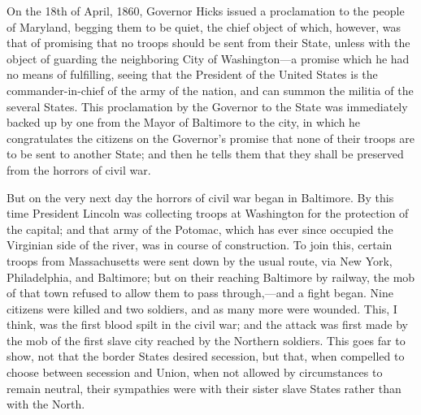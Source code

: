 On the 18th of April, 1860, Governor Hicks issued a proclamation to
the people of Maryland, begging them to be quiet, the chief object
of which, however, was that of promising that no troops should be
sent from their State, unless with the object of guarding the
neighboring City of Washington---a promise which he had no means of
fulfilling, seeing that the President of the United States is the
commander-in-chief of the army of the nation, and can summon the
militia of the several States.  This proclamation by the Governor
to the State was immediately backed up by one from the Mayor of
Baltimore to the city, in which he congratulates the citizens on
the Governor's promise that none of their troops are to be sent to
another State; and then he tells them that they shall be preserved
from the horrors of civil war.

But on the very next day the horrors of civil war began in
Baltimore.  By this time President Lincoln was collecting troops at
Washington for the protection of the capital; and that army of the
Potomac, which has ever since occupied the Virginian side of the
river, was in course of construction.  To join this, certain troops
from Massachusetts were sent down by the usual route, via New York,
Philadelphia, and Baltimore; but on their reaching Baltimore by
railway, the mob of that town refused to allow them to pass
through,---and a fight began.  Nine citizens were killed and two
soldiers, and as many more were wounded.  This, I think, was the
first blood spilt in the civil war; and the attack was first made
by the mob of the first slave city reached by the Northern
soldiers.  This goes far to show, not that the border States
desired secession, but that, when compelled to choose between
secession and Union, when not allowed by circumstances to remain
neutral, their sympathies were with their sister slave States
rather than with the North.


